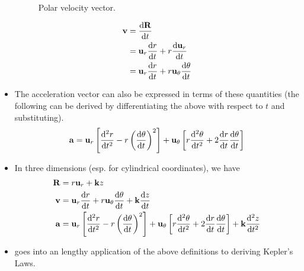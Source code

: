\documentclass[../main.tex]{subfiles}
\begin{document}
\begin{itemize}
\begin{figure}[h!]
        \caption{Polar velocity vector.}
        \label{fig:polarVelocityVector}
    \end{figure}
    \begin{align*}
        \vb{v} &= \dv{\vb{R}}{t}\\
        &= \vb{u}_r\dv{r}{t}+r\dv{\vb{u}_r}{t}\\
        &= \vb{u}_r\dv{r}{t}+r\vb{u}_\theta\dv{\theta}{t}
    \end{align*}
    \item The acceleration vector can also be expressed in terms of these quantities (the following can be derived by differentiating the above with respect to $t$ and substituting).
    \begin{equation*}
        \vb{a} = \vb{u}_r\left[ \dv[2]{r}{t}-r\left( \dv{\theta}{t} \right)^2 \right]+\vb{u}_\theta\left[ r\dv[2]{\theta}{t}+2\dv{r}{t}\dv{\theta}{t} \right]
    \end{equation*}
    \item In three dimensions (esp. for cylindrical coordinates), we have
    \begin{align*}
        \vb{R} &= r\vb{u}_r+\vb{k}z\\
        \vb{v} &= \vb{u}_r\dv{r}{t}+r\vb{u}_\theta\dv{\theta}{t}+\vb{k}\dv{z}{t}\\
        \vb{a} &= \vb{u}_r\left[ \dv[2]{r}{t}-r\left( \dv{\theta}{t} \right)^2 \right]+\vb{u}_\theta\left[ r\dv[2]{\theta}{t}+2\dv{r}{t}\dv{\theta}{t} \right]+\vb{k}\dv[2]{z}{t}
    \end{align*}
    \item \textcite{bib:Thomas} goes into an lengthy application of the above definitions to deriving Kepler's Laws.
\end{itemize}
\end{document}
